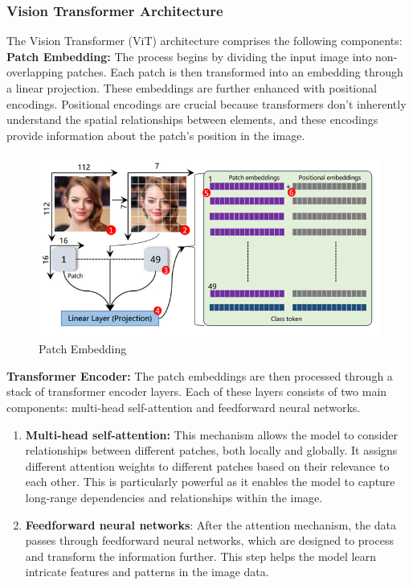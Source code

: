 \subsubsection{Vision Transformer Architecture}

\noindent The Vision Transformer (ViT) architecture comprises the following components:
\\

\noindent \textbf{Patch Embedding:} The process begins by dividing the input image into non-overlapping patches. Each patch is then transformed into an embedding through a linear projection. These embeddings are further enhanced with positional encodings. Positional encodings are crucial because transformers don't inherently understand the spatial relationships between elements, and these encodings provide information about the patch's position in the image.
\\
\begin{figure}[htbp]
    \centering
    \includegraphics[width=6in]{img/patchembedding.jpg}
    \caption{Patch Embedding}
\end{figure}

\noindent \textbf{Transformer Encoder:} The patch embeddings are then processed through a stack of transformer encoder layers. Each of these layers consists of two main components: multi-head self-attention and feedforward neural networks.

\begin{enumerate}
    \item \textbf{Multi-head self-attention:} This mechanism allows the model to consider relationships between different patches, both locally and globally. It assigns different attention weights to different patches based on their relevance to each other. This is particularly powerful as it enables the model to capture long-range dependencies and relationships within the image.

    \item \textbf{Feedforward neural networks}: After the attention mechanism, the data passes through feedforward neural networks, which are designed to process and transform the information further. This step helps the model learn intricate features and patterns in the image data.
\end{enumerate}


